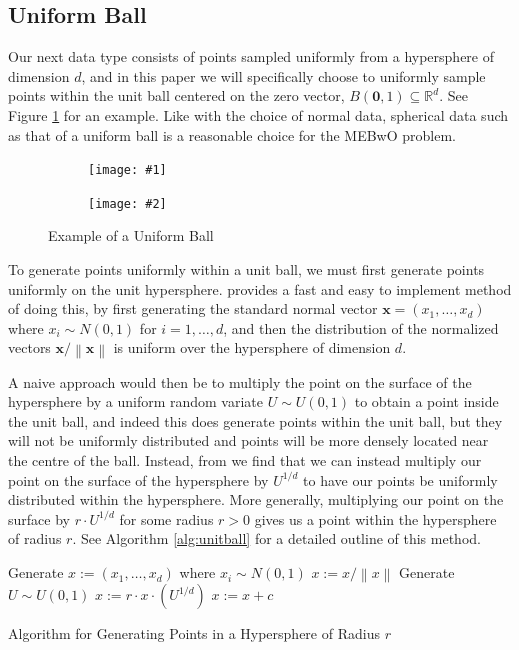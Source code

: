 \documentclass[11pt,twoside]{report}
\newcommand{\norm}[1]{\left\lVert#1\right\rVert} %
\newcommand{\datafigure}[4]{
    \begin{figure}
    \centering
    \begin{subfigure}[b]{0.3333\textwidth}
        \centering
        \texttt{[image: \#1]}
    \end{subfigure}
    \begin{subfigure}[b]{0.3333\textwidth}
        \centering
        \texttt{[image: \#2]}
    \end{subfigure}
    \hfill
    \caption{#3}
    \label{#4}
\end{figure}
}
\theoremstyle{definition}
\numberwithin{theorem}{section}
\numberwithin{definition}{section}
\numberwithin{lemma}{section}
\numberwithin{proposition}{section}
\numberwithin{equation}{section}
\numberwithin{figure}{section}
\begin{document}
\subsection{Uniform Ball}\label{uniform ball}
Our next data type consists of points sampled uniformly from a hypersphere of dimension $d$, and in this paper we will specifically choose to uniformly sample points within the unit ball centered on the zero vector, $B(\mathbf{0},1)\subseteq\mathbb{R}^d$. See Figure \ref{fig:unifball} for an example. Like with the choice of normal data, spherical data such as that of a uniform ball is a reasonable choice for the MEBwO problem.

\datafigure{uniform_ball_2d.png}{uniform_ball_3d.png}{Example of a Uniform Ball}{fig:unifball}

To generate points uniformly within a unit ball, we must first generate points uniformly on the unit hypersphere. \cite{hyperspheresurface} provides a fast and easy to implement method of doing this, by first generating the standard normal vector $\mathbf{x}=(x_1,\ldots,x_d)$ where $x_i\sim N(0,1)$ for $i=1,\ldots,d$, and then the distribution of the normalized vectors $\mathbf{x}/\norm{\mathbf{x}}$ is uniform over the hypersphere of dimension $d$.

A naive approach would then be to multiply the point on the surface of the hypersphere by a uniform random variate $U\sim U(0,1)$ to obtain a point inside the unit ball, and indeed this does generate points within the unit ball, but they will not be uniformly distributed and points will be more densely located near the centre of the ball. Instead, from \cite{eldredge} we find that we can instead multiply our point on the surface of the hypersphere by $U^{1/d}$ to have our points be uniformly distributed within the hypersphere. More generally, multiplying our point on the surface by $r\cdot U^{1/d}$ for some radius $r>0$ gives us a point within the hypersphere of radius $r$. See Algorithm \ref{alg:unitball} for a detailed outline of this method.

\begin{algorithm}[H]
    Generate $x:=(x_1,\ldots,x_d)$ where $x_i\sim N(0,1)$\;
    $x:=x/\norm{x}$\;
    Generate $U\sim U(0,1)$\;
    $x:=r\cdot x\cdot \left(U^{1/d}\right)$\;
    $x:= x+c$\;
    
    \caption{Algorithm for Generating Points in a Hypersphere of Radius $r$}
    \label{alg:unitball}
\end{algorithm}
\end{document}
